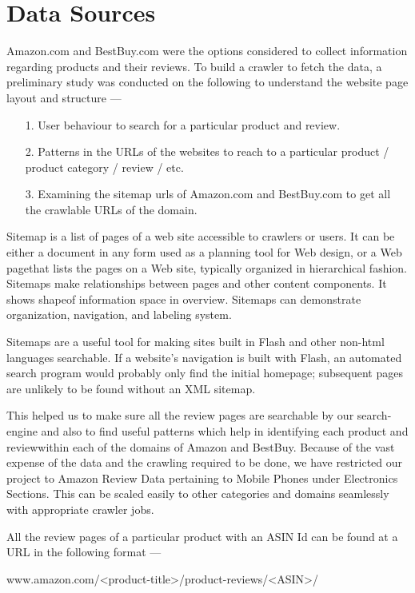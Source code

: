 \documentclass{article}
\begin{document}
\section{Data Sources}
Amazon.com and BestBuy.com were the options considered to collect information regarding products and their reviews. To build a crawler to fetch the data, a preliminary study was conducted on the following to understand the website page layout and structure ---

\begin{enumerate}
	\item[1. ] User behaviour to search for a particular product and review.
	\item[2. ] Patterns in the URLs of the websites to reach to a particular product / product category / review / etc.
	\item[3. ] Examining the sitemap urls of Amazon.com and BestBuy.com to get all the crawlable URLs of the domain.
\end{enumerate} 

Sitemap is a list of pages of a web site accessible to crawlers or users. It can be either a document in any form used as a planning tool for Web design, or a Web pagethat lists the pages on a Web site, typically organized in hierarchical fashion. Sitemaps make relationships between pages and other content components. It shows shapeof information space in overview. Sitemaps can demonstrate organization, navigation, and labeling system.

Sitemaps are a useful tool for making sites built in Flash and other non-html languages searchable. If a website's navigation is built with Flash, an automated search program would probably only find the initial homepage; subsequent pages are unlikely to be found without an XML sitemap.

This helped us to make sure all the review pages are searchable by our search-engine and also to find useful patterns which help in identifying each product and reviewwithin each of the domains of Amazon and BestBuy. Because of the vast expense of the data and the crawling required to be done, we have restricted our project to Amazon Review Data pertaining to Mobile Phones under Electronics Sections. This can be scaled easily to other categories and domains seamlessly with appropriate crawler jobs. 

All the review pages of a particular product with an ASIN Id can be found at a URL in the following format ---

\begin{center}
\label{sec:urlPattern}
	www.amazon.com/<product-title>/product-reviews/<ASIN>/
\end{center}
\end{document}

